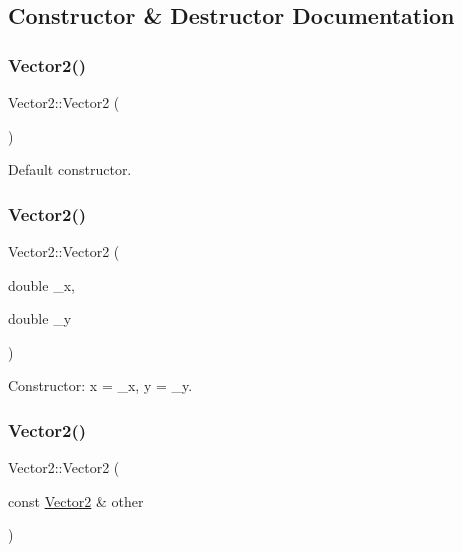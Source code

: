 \subsection{Constructor \& Destructor Documentation}
\mbox{\label{struct_vector2_a22104d1809be26a419ef1f959e3761bf}} 
\subsubsection{\texorpdfstring{Vector2()}{Vector2()}\hspace{0.1cm}{\footnotesize\ttfamily [1/3]}}
{\footnotesize\ttfamily Vector2\+::\+Vector2 (\begin{DoxyParamCaption}{ }\end{DoxyParamCaption})}



Default constructor. 

\mbox{\label{struct_vector2_a861062b13bd0e92d50b3ffd90c9edd77}} 
\subsubsection{\texorpdfstring{Vector2()}{Vector2()}\hspace{0.1cm}{\footnotesize\ttfamily [2/3]}}
{\footnotesize\ttfamily Vector2\+::\+Vector2 (\begin{DoxyParamCaption}\item[{double}]{\+\_\+x,  }\item[{double}]{\+\_\+y }\end{DoxyParamCaption})}



Constructor\+: x = \+\_\+x, y = \+\_\+y. 

\mbox{\label{struct_vector2_ac0c70e89b089fb619dae62c32ccde4ec}} 
\subsubsection{\texorpdfstring{Vector2()}{Vector2()}\hspace{0.1cm}{\footnotesize\ttfamily [3/3]}}
{\footnotesize\ttfamily Vector2\+::\+Vector2 (\begin{DoxyParamCaption}\item[{const \mbox{\hyperlink{struct_vector2}{Vector2}} \&}]{other }\end{DoxyParamCaption})}



